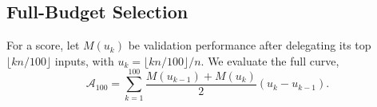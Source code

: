 \subsection{Full-Budget Selection}
\label{sec:selection}
For a score, let $M(u_k)$ be validation performance after delegating its top $\lfloor kn/100\rfloor$ inputs, with $u_k=\lfloor kn/100\rfloor/n$. We evaluate the full curve,
\begin{equation}
\mathcal A_{100}=\sum_{k=1}^{100}\frac{M(u_{k-1})+M(u_k)}2(u_k-u_{k-1}).
\label{eq:area}
\end{equation}
